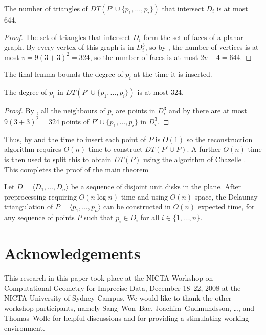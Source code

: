 \documentclass[lotsofwhite]{patmorin}
\begin{document}
\begin{lem}
The number of triangles of $DT(P'\cup\{p_1,\ldots,p_i\})$ that
intersect $D_i$ is at most 644.
\end{lem}

\begin{proof}
The set of triangles that intersect $D_i$ form the set of faces of a
planar graph.  By  every vertex of this graph is in
$D_i^3$, so by , the number of vertices 
is at most $v=9(3+3)^2=324$, so the number of faces is at most
$2v-4=644$. 
\end{proof}

The final lemma bounds the degree of $p_i$ at the time it is inserted.

\begin{lem}
The degree of $p_i$ in $DT(P'\cup\{p_1,\ldots,p_i\})$ is at most 324.
\end{lem}

\begin{proof}
By , all the neighbours of $p_i$ are points in $D_i^3$
and by  there are at most $9(3+3)^2=324$ points
of $P'\cup\{p_1,\ldots,p_i\}$ in $D_i^3$.
\end{proof}

Thus, by  and  the time to insert
each point of $P$ is $O(1)$ so the reconstruction algorithm requires
$O(n)$ time to construct $DT(P'\cup P)$.  A further $O(n)$ time is
then used to split this to obtain $DT(P)$ using the algorithm of
Chazelle \etal.  This completes the proof of the main theorem

\begin{thm}
Let $D=\langle D_1,\ldots,D_n\rangle$ be a sequence of disjoint unit
disks in the plane.  After preprocessing requiring $O(n\log n)$ time
and using $O(n)$ space, the Delaunay triangulation of $P=\langle
p_1,\ldots,p_n\rangle$ can be constructed in $O(n)$ expected time, for any
sequence of points $P$ such that $p_i\in D_i$ for all
$i\in\{1,\ldots,n\}$.
\end{thm}

\section*{Acknowledgements}

This research in this paper took place at the NICTA Workshop on
Computational Geometry for Imprecise Data, December 18--22, 2008 at
the NICTA University of Sydney Campus.  We would like to thank the
other workshop participants, namely
Sang~Won~Bae,
Joachim~Gudmundsson,
\ldots,
and
Thomas~Wolle
for helpful discussions and for providing a stimulating working
environment.



\end{document}
